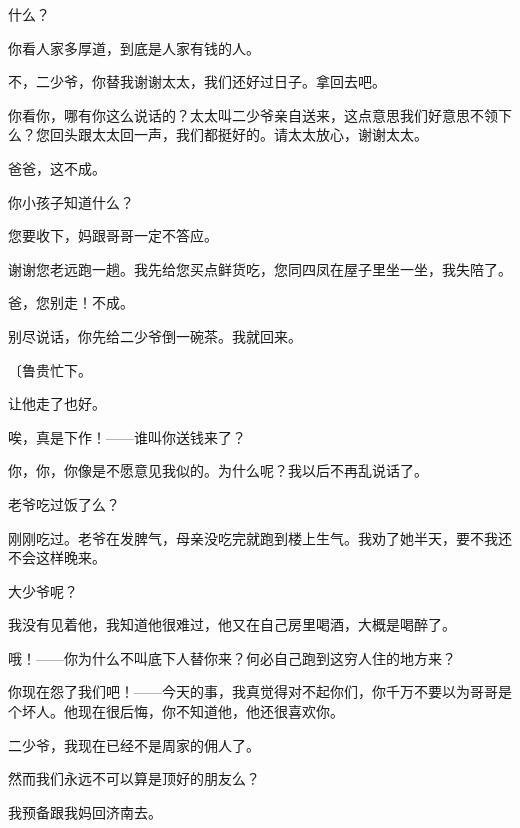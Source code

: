 什么？

你看人家多厚道，到底是人家有钱的人。

不，二少爷，你替我谢谢太太，我们还好过日子。拿回去吧。

你看你，哪有你这么说话的？太太叫二少爷亲自送来，这点意思我们好意思不领下么？您回头跟太太回一声，我们都挺好的。请太太放心，谢谢太太。

爸爸，这不成。

你小孩子知道什么？

您要收下，妈跟哥哥一定不答应。

谢谢您老远跑一趟。我先给您买点鲜货吃，您同四凤在屋子里坐一坐，我失陪了。

爸，您别走！不成。

别尽说话，你先给二少爷倒一碗茶。我就回来。

{\fangsong〔鲁贵忙下。}

让他走了也好。

唉，真是下作！——谁叫你送钱来了？

你，你，你像是不愿意见我似的。为什么呢？我以后不再乱说话了。

老爷吃过饭了么？

刚刚吃过。老爷在发脾气，母亲没吃完就跑到楼上生气。我劝了她半天，要不我还不会这样晚来。

大少爷呢？

我没有见着他，我知道他很难过，他又在自己房里喝酒，大概是喝醉了。

哦！——你为什么不叫底下人替你来？何必自己跑到这穷人住的地方来？

你现在怨了我们吧！——今天的事，我真觉得对不起你们，你千万不要以为哥哥是个坏人。他现在很后悔，你不知道他，他还很喜欢你。

二少爷，我现在已经不是周家的佣人了。

然而我们永远不可以算是顶好的朋友么？

我预备跟我妈回济南去。

